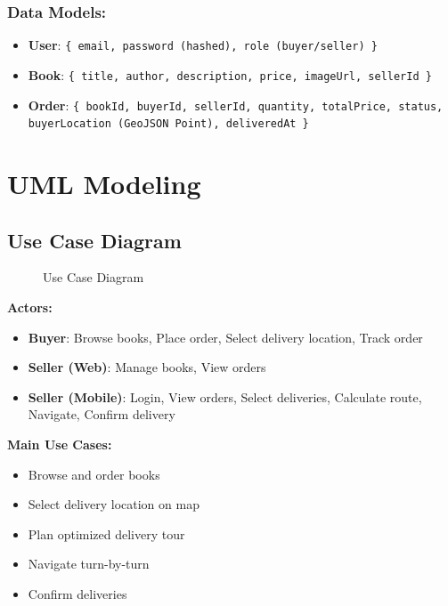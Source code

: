 \documentclass[12pt,a4paper]{article}
\begin{document}
\subsubsection{Data Models:}

\begin{itemize}
    \item \textbf{User}: \texttt{\{ email, password (hashed), role (buyer/seller) \}}
    \item \textbf{Book}: \texttt{\{ title, author, description, price, imageUrl, sellerId \}}
    \item \textbf{Order}: \texttt{\{ bookId, buyerId, sellerId, quantity, totalPrice, status, buyerLocation (GeoJSON Point), deliveredAt \}}
\end{itemize}

\newpage

\section{UML Modeling}

\subsection{Use Case Diagram}

\begin{figure}[h]
    \centering
    \caption{Use Case Diagram}
\end{figure}

\textbf{Actors:}
\begin{itemize}
    \item \textbf{Buyer}: Browse books, Place order, Select delivery location, Track order
    \item \textbf{Seller (Web)}: Manage books, View orders
    \item \textbf{Seller (Mobile)}: Login, View orders, Select deliveries, Calculate route, Navigate, Confirm delivery
\end{itemize}

\textbf{Main Use Cases:}
\begin{itemize}
    \item Browse and order books
    \item Select delivery location on map
    \item Plan optimized delivery tour
    \item Navigate turn-by-turn
    \item Confirm deliveries
\end{itemize}
\end{document}
